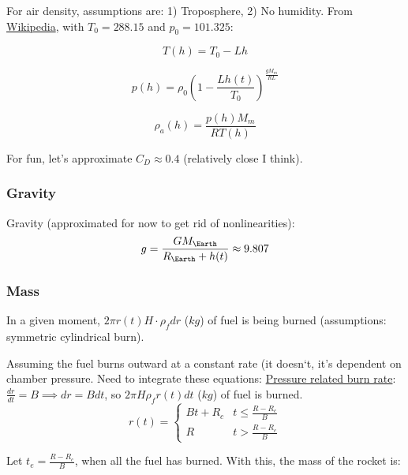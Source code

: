 \documentclass[12pt,a4paper]{article}
\begin{document}
For air density, assumptions are: 1) Troposphere, 2) No humidity. From \href{https://en.wikipedia.org/wiki/Density_of_air#Altitude}{Wikipedia}, with $T_0 = 288.15$ and $p_0 = 101.325$:

\begin{equation}
T(h) = T_0 - Lh
\label{eq:air-temp}
\end{equation}

\begin{equation}
p(h) = \rho_0\left(1-\frac{Lh(t)}{T_0}\right)^\frac{gM_m}{RL}
\label{eq:air-pressure}
\end{equation}

\begin{equation}
\rho_a(h) = \frac{p(h)M_m}{RT(h)}
\label{eq:air-density}
\end{equation}

For fun, let’s approximate $C_D \approx 0.4$ (relatively close I think).

\subsubsection{Gravity}
Gravity (approximated for now to get rid of nonlinearities):
$$g=\frac{GM_{\Earth}}{R_{\Earth} + h(t)} \approx 9.807$$

\subsubsection{Mass}
In a given moment, $2\pi r(t) H \cdot \rho_f dr$ ($kg$) of fuel is being burned (assumptions: symmetric cylindrical burn). 

Assuming the fuel burns outward at a constant rate (it doesn‘t, it’s dependent on chamber pressure. Need to integrate these equations: \hyperlink{https://www.nakka-rocketry.net/burnrate.html}{Pressure related burn rate}: $\frac{dr}{dt}=B\implies dr=Bdt$, so $2\pi H \rho_f r(t)dt$ ($kg$) of fuel is burned.
\begin{equation}
r(t) = \begin{cases}
Bt + R_c & t \le \frac{R - R_c}{B} \\
R      & t > \frac{R - R_c}{B}
\end{cases}
\label{eq:inner-radius}
\end{equation}

Let $t_e = \frac{R-R_c}{B}$, when all the fuel has burned. With this, the mass of the rocket is:
\end{document}
